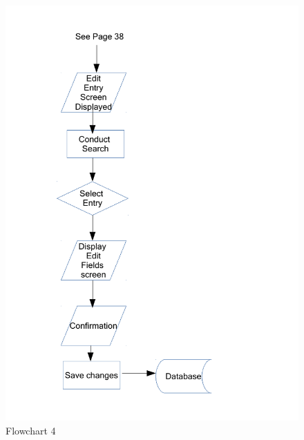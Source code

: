 \begin{figure}[H]
    \caption{Flowchart 4} \label{Flowchart_4.pdf}
    \includegraphics[width=\textwidth]{./Design/Flowcharts/Flowchart_4.pdf}
\end{figure}


